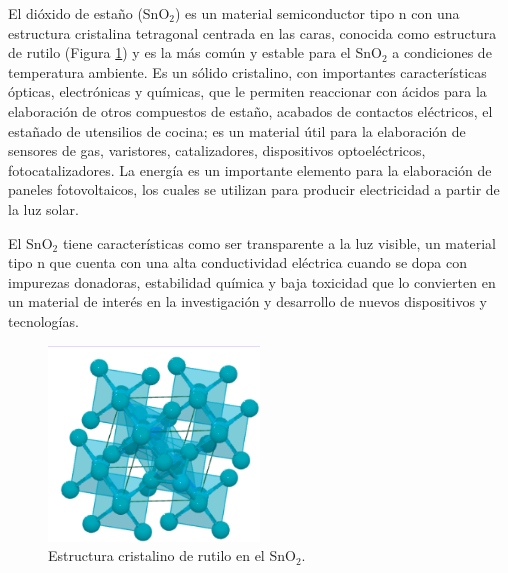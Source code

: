 \documentclass[12pt]{article}
\begin{document}
    El dióxido de estaño (SnO$\displaystyle _{2}$) es un material semiconductor tipo n con una estructura cristalina tetragonal centrada en las caras, conocida como estructura de rutilo (Figura \ref{fig:Rutilo}) y es la más común y estable para el SnO$\displaystyle _{2}$ a condiciones de temperatura ambiente. Es un sólido cristalino, con importantes características ópticas, electrónicas y químicas, que le permiten reaccionar con ácidos para la elaboración de otros compuestos de estaño, acabados de contactos eléctricos, el estañado de utensilios de cocina; es un material útil para la elaboración de sensores de gas, varistores, catalizadores, dispositivos optoeléctricos, fotocatalizadores. La energía es un importante elemento para la elaboración de paneles fotovoltaicos, los cuales se utilizan para producir electricidad a partir de la luz solar.\vspace{1em} %

El SnO$\displaystyle _{2}$  tiene características como ser transparente a la luz visible, un material tipo n que cuenta con una alta conductividad eléctrica cuando se dopa con impurezas donadoras, estabilidad química y baja toxicidad que lo convierten en un material de interés en la investigación y desarrollo de nuevos dispositivos y tecnologías\cite{IEEEreferencias:Ref10,IEEEreferencias:Ref11,IEEEreferencias:Ref12,IEEEreferencias:Ref13,IEEEreferencias:Ref14,IEEEreferencias:Ref15, IEEEreferencias:Ref16, IEEEreferencias:Ref17}.

        \begin{figure}[H]
    	   \begin{center}
     	  	\includegraphics[width = 0.5\textwidth]{Imagenes/Rutilo.png}
     	  	\caption{Estructura cristalino de rutilo en el SnO$\displaystyle _{2}$.}\label{fig:Rutilo}  
    	   \end{center} 
        \end{figure}
     
\end{document}
